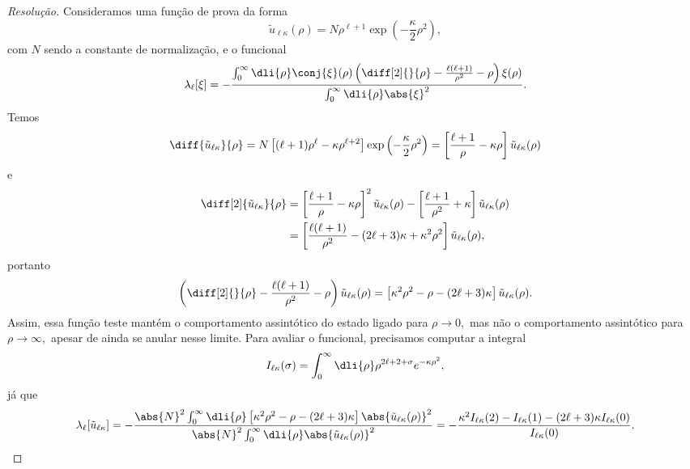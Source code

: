 \begin{proof}[Resolução]
   Consideramos uma função de prova da forma
   \begin{equation*}
      \tilde{u}_{\ell\kappa}(\rho) = N\rho^{\ell+1} \exp\left(-\frac{\kappa}2\rho^2\right),
   \end{equation*}
   com \(N\) sendo a constante de normalização, e o funcional
   \begin{equation*}
      \lambda_\ell[\xi] = -\frac{\int_0^{\infty} \dli{\rho} \conj{\xi}(\rho) \left(\diff[2]{}{\rho} - \frac{\ell(\ell + 1)}{\rho^2} - \rho\right) \xi(\rho)}{\int_0^\infty \dli{\rho} \abs{\xi}^2}.
   \end{equation*}
   Temos
   \begin{equation*}
      \diff{\tilde{u}_{\ell \kappa}}{\rho} = N\left[(\ell+1) \rho^{\ell} - \kappa \rho^{\ell + 2}\right]\exp\left(-\frac{\kappa}{2} \rho^2\right) = \left[\frac{\ell + 1}{\rho} - \kappa \rho\right]\tilde{u}_{\ell \kappa}(\rho)
   \end{equation*}
   e
   \begin{align*}
      \diff[2]{\tilde{u}_{\ell \kappa}}{\rho} &= \left[\frac{\ell + 1}{\rho} - \kappa \rho\right]^2 \tilde{u}_{\ell \kappa}(\rho)-\left[\frac{\ell + 1}{\rho^2} + \kappa\right]\tilde{u}_{\ell \kappa}(\rho)\\
                                              &= \left[\frac{\ell (\ell+1)}{\rho^2} - (2\ell + 3)\kappa + \kappa^2 \rho^2\right]\tilde{u}_{\ell \kappa}(\rho),
   \end{align*}
   portanto
   \begin{equation*}
      \left(\diff[2]{}{\rho} - \frac{\ell(\ell + 1)}{\rho^2} - \rho\right)\tilde{u}_{\ell \kappa}(\rho) = \left[\kappa^2 \rho^2 - \rho - (2 \ell + 3) \kappa\right]\tilde{u}_{\ell \kappa}(\rho).
   \end{equation*}
   Assim, essa função teste mantém o comportamento assintótico do estado ligado para \(\rho \to 0,\) mas não o comportamento assintótico para \(\rho \to \infty,\) apesar de ainda se anular nesse limite. Para avaliar o funcional, precisamos computar a integral 
   \begin{equation*}
      I_{\ell \kappa}(\sigma) = \int_0^\infty\dli{\rho} \rho^{2\ell + 2 + \sigma} e^{-\kappa \rho^2},
   \end{equation*}
   já que
   \begin{equation*}
      \lambda_\ell[\tilde{u}_{\ell \kappa}] = -\frac{\abs{N}^2\int_0^\infty\dli{\rho} \left[\kappa^2 \rho^2 - \rho - (2 \ell + 3)\kappa\right]\abs{\tilde{u}_{\ell \kappa}(\rho)}^2}{\abs{N}^2\int_0^\infty \dli{\rho} \abs{\tilde{u}_{\ell \kappa}(\rho)}^2} = -\frac{\kappa^2 I_{\ell \kappa}(2) - I_{\ell \kappa}(1) - (2\ell + 3)\kappa I_{\ell \kappa}(0)}{I_{\ell \kappa}(0)}.

\end{equation*}
\end{proof}
